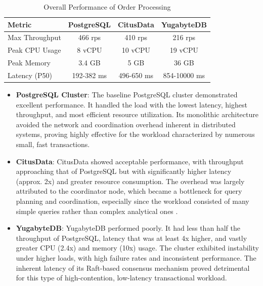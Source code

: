 \begin{table}[h]
    \caption{Overall Performance of Order Processing}
    \label{tab:perf_summary}
    \centering
    \begin{tabular}{|l|c|c|c|}
        \hline
        \textbf{Metric} & \textbf{PostgreSQL} & \textbf{CitusData} & \textbf{YugabyteDB} \\
        \hline
        Max Throughput  & 466 rps             & 410 rps            & 216 rps             \\
        \hline
        Peak CPU Usage  & 8 vCPU              & 10 vCPU            & 19 vCPU             \\
        \hline
        Peak Memory     & 3.4 GB              & 5 GB               & 36 GB               \\
        \hline
        Latency (P50)   & 192-382 ms          & 496-650 ms         & 854-10000 ms        \\
        \hline
    \end{tabular}
\end{table}

\begin{itemize}
    \item \textbf{PostgreSQL Cluster}: The baseline PostgreSQL cluster demonstrated excellent performance. It handled the load with the lowest latency, highest throughput, and most efficient resource utilization. Its monolithic architecture avoided the network and coordination overhead inherent in distributed systems, proving highly effective for the workload characterized by numerous small, fast transactions.

    \item \textbf{CitusData}: CitusData showed acceptable performance, with throughput approaching that of PostgreSQL but with significantly higher latency (approx. 2x) and greater resource consumption. The overhead was largely attributed to the coordinator node, which became a bottleneck for query planning and coordination, especially since the workload consisted of many simple queries rather than complex analytical ones \cite{Slot2020}.

    \item \textbf{YugabyteDB}: YugabyteDB performed poorly. It had less than half the throughput of PostgreSQL, latency that was at least 4x higher, and vastly greater CPU (2.4x) and memory (10x) usage. The cluster exhibited instability under higher loads, with high failure rates and inconsistent performance. The inherent latency of its Raft-based consensus mechanism proved detrimental for this type of high-contention, low-latency transactional workload.

\end{itemize}

